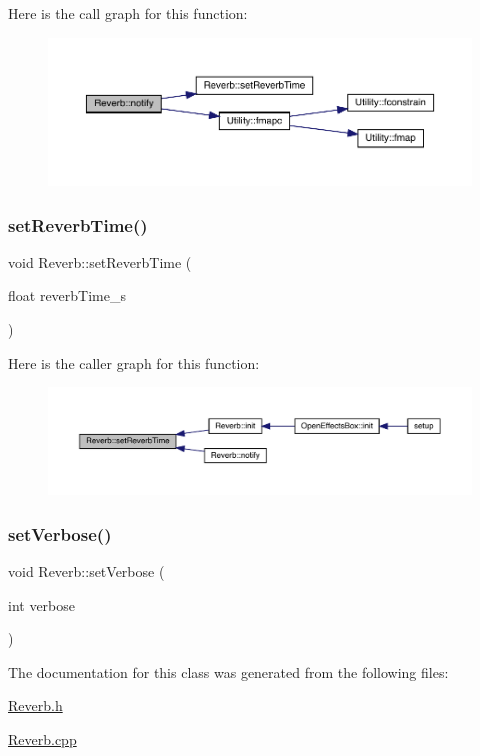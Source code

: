 Here is the call graph for this function\+:\nopagebreak
\begin{figure}[H]
\begin{center}
\leavevmode
\includegraphics[width=350pt]{class_reverb_a0a4818faef8203311b3c31eb9d59c277_cgraph}
\end{center}
\end{figure}
\mbox{\label{class_reverb_a6bc52d8dde1853a63a8e01e7d20a678e}} 
\subsubsection{\texorpdfstring{set\+Reverb\+Time()}{setReverbTime()}}
{\footnotesize\ttfamily void Reverb\+::set\+Reverb\+Time (\begin{DoxyParamCaption}\item[{float}]{reverb\+Time\+\_\+s }\end{DoxyParamCaption})}

Here is the caller graph for this function\+:\nopagebreak
\begin{figure}[H]
\begin{center}
\leavevmode
\includegraphics[width=350pt]{class_reverb_a6bc52d8dde1853a63a8e01e7d20a678e_icgraph}
\end{center}
\end{figure}
\mbox{\label{class_reverb_a9b0d44b54237d7eec20b6e6de4befa6a}} 
\subsubsection{\texorpdfstring{set\+Verbose()}{setVerbose()}}
{\footnotesize\ttfamily void Reverb\+::set\+Verbose (\begin{DoxyParamCaption}\item[{int}]{verbose }\end{DoxyParamCaption})}



The documentation for this class was generated from the following files\+:\begin{DoxyCompactItemize}
\item 
\mbox{\hyperlink{_reverb_8h}{Reverb.\+h}}\item 
\mbox{\hyperlink{_reverb_8cpp}{Reverb.\+cpp}}\end{DoxyCompactItemize}
